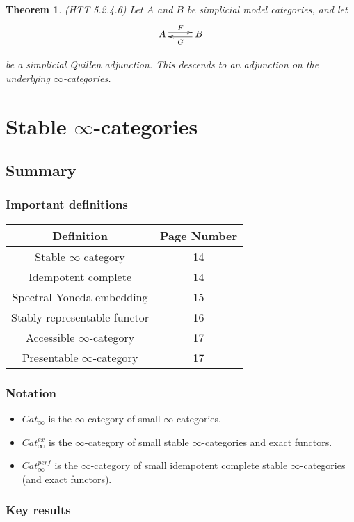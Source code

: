 \documentclass[letterpaper]{article}
\newtheorem{theorem}{Theorem}
\theoremstyle{definition}
\begin{document}
\begin{theorem}(HTT 5.2.4.6)
Let $A$ and $B$ be simplicial model categories, and let 
\[
\xymatrix{A \ar@<.5ex>[r]^F & \ar@<.5ex>[l]^G B}
\]

be a simplicial Quillen adjunction. This descends to an adjunction on
the underlying $\infty$-categories.
\end{theorem}

\section{Stable $\infty$-categories}

\subsection{Summary}
\subsubsection{Important definitions}
\begin{tabular}{|c|c|}
\hline
Definition & Page Number\\
\hline
\hline
Stable $\infty$ category & 14\\
\hline
Idempotent complete & 14\\
\hline
Spectral Yoneda embedding & 15\\
\hline
Stably representable functor & 16\\
\hline
Accessible $\infty$-category & 17\\
\hline
Presentable $\infty$-category & 17\\
\hline
\end{tabular}

\subsubsection{Notation}

\begin{itemize}
\item $Cat_\infty$ is the $\infty$-category of small $\infty$ categories.
\item $Cat^{ex}_\infty$ is the $\infty$-category of small stable $\infty$-categories and exact functors. 
\item $Cat^{perf}_\infty$ is the $\infty$-category of small idempotent complete stable $\infty$-categories (and exact functors).
\end{itemize}

\subsubsection{Key results}
\end{document}
